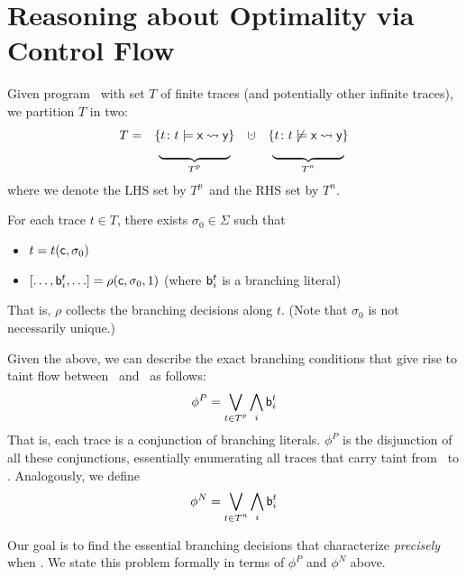 \documentclass[]{article}
\begin{document}
\newcommand{\cupdot}{\mathbin{\mathaccent\cdot\cup}}

\newcommand{\Tp}{\textnormal{$T^p$}}
\newcommand{\Tn}{\textnormal{$T^n$}}

\section{Reasoning about Optimality via Control Flow}

Given program \prog\ with set $T$ of finite traces (and potentially other infinite traces), we partition $T$ in two:
$$
\begin{array}{rccc}
T = & \{ t \colon t \models \query{\xvar}{\yvar} \} & \cupdot & \{ t \colon t \not\models \query{\xvar}{\yvar} \} \\
     &  \underbrace{~~~~~~~~~~~~~~~~~}_{\Tp}  &    & \underbrace{~~~~~~~~~~~~~~~~~}_{\Tn} \\
\end{array}
$$
where we denote the LHS set by \Tp\ and the RHS set by \Tn.

For each trace $t \in T$, there exists $\sigma_0 \in \Sigma$ such that
\begin{itemize}
	\item $t=t({\sf c},\sigma_0)$
	\item $[ \ldots, {\sf b}^t_i, \ldots ] = \rho({\sf c},\sigma_0,1)$ (where ${\sf b}^t_i$ is a branching literal)
\end{itemize}
That is, $\rho$ collects the branching decisions along $t$. (Note that $\sigma_0$ is not necessarily unique.)

Given the above, we can describe the exact branching conditions that give rise to taint flow between \xvar\ and \yvar\ as follows:
\begin{equation}\label{Eq:preciseCond}
	\phi^P = \bigvee_{t \in \Tp} \bigwedge_i {\sf b}^t_i 
\end{equation}
That is, each trace is a conjunction of branching literals. $\phi^P$ is the disjunction of all these conjunctions, essentially enumerating all traces that carry taint from \xvar\ to \yvar.
Analogously, we define
\begin{equation}\label{Eq:preciseNegCond}
	\phi^N = \bigvee_{t \in \Tn} \bigwedge_i {\sf b}^t_i 
\end{equation}

Our goal is to find the essential branching decisions that characterize \emph{precisely} when \query{\xvar}{\yvar}. We state this problem formally in terms of $\phi^P$ and $\phi^N$ above.
\end{document}
